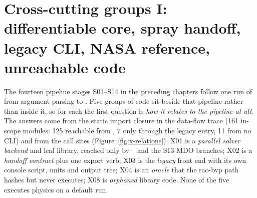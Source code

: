 \chapter{Cross-cutting groups I: differentiable core, spray handoff, legacy CLI, NASA reference, unreachable code}\label{ch:crosscutting-a}
\newcommand{\chtenTables}{\footnotesize\renewcommand{\code}[1]{{\footnotesize\path{##1}}}\setlength{\tabcolsep}{4pt}}

The fourteen pipeline stages S01--S14 in the preceding chapters follow one run of  from argument parsing to . Five groups of code sit beside that pipeline rather than inside it, so for each the first question is \emph{how it relates to the pipeline at all}. The answers come from the static import closure in the data-flow trace (161 in-scope modules: 125 reachable from , 7 only through the legacy entry, 11 from no CLI) and from the call sites (Figure~\ref{fig:x-relations}). X01 is a \emph{parallel solver backend} and leaf library, reached only by ~ and the S13 MDO branches; X02 is a \emph{handoff contract} plus one export verb; X03 is the \emph{legacy} front end with its own console script, units and output tree; X04 is an \emph{oracle} that the rao-bvp path hashes but never executes; X08 is \emph{orphaned} library code. None of the five executes physics on a default  run.

